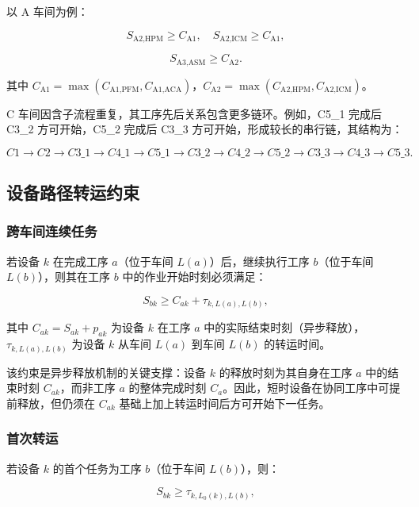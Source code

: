 \documentclass[UTF8,a4paper,12pt]{ctexart}
\begin{document}
以 A 车间为例：

\begin{equation}
S_{\text{A2},\text{HPM}} \geq C_{\text{A1}}, \quad S_{\text{A2},\text{ICM}} \geq C_{\text{A1}},
\end{equation}

\begin{equation}
S_{\text{A3},\text{ASM}} \geq C_{\text{A2}}.
\end{equation}

其中 $C_{\text{A1}} = \max(C_{\text{A1},\text{PFM}}, C_{\text{A1},\text{ACA}})$，$C_{\text{A2}} = \max(C_{\text{A2},\text{HPM}}, C_{\text{A2},\text{ICM}})$。

C 车间因含子流程重复，其工序先后关系包含更多链环。例如，C5\_1 完成后 C3\_2 方可开始，C5\_2 完成后 C3\_3 方可开始，形成较长的串行链，其结构为：

$$
C1 \to C2 \to C3\_1 \to C4\_1 \to C5\_1 \to C3\_2 \to C4\_2 \to C5\_2 \to C3\_3 \to C4\_3 \to C5\_3.
$$

\subsection{设备路径转运约束}
\subsubsection{跨车间连续任务}
若设备 $k$ 在完成工序 $a$（位于车间 $L(a)$）后，继续执行工序 $b$（位于车间 $L(b)$），则其在工序 $b$ 中的作业开始时刻必须满足：

\begin{equation}
S_{bk} \geq C_{ak} + \tau_{k, L(a), L(b)},
\end{equation}

其中 $C_{ak} = S_{ak} + p_{ak}$ 为设备 $k$ 在工序 $a$ 中的实际结束时刻（异步释放），$\tau_{k,L(a),L(b)}$ 为设备 $k$ 从车间 $L(a)$ 到车间 $L(b)$ 的转运时间。

该约束是异步释放机制的关键支撑：设备 $k$ 的释放时刻为其自身在工序 $a$ 中的结束时刻 $C_{ak}$，而非工序 $a$ 的整体完成时刻 $C_a$。因此，短时设备在协同工序中可提前释放，但仍须在 $C_{ak}$ 基础上加上转运时间后方可开始下一任务。

\subsubsection{首次转运}
若设备 $k$ 的首个任务为工序 $b$（位于车间 $L(b)$），则：

\begin{equation}
S_{bk} \geq \tau_{k, L_0(k), L(b)},
\end{equation}
\end{document}
